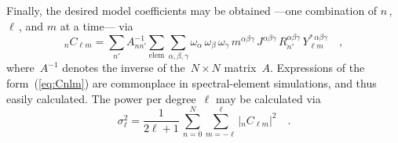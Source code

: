 \documentclass[extra,mreferee]{gji}
\begin{document}
Finally, the desired model coefficients may be obtained ---one combination of $n$\,, $\ell$\,, and $m$ at a time--- via
\begin{equation}
    {}_nC_{\ell m}=\sum_{n'}A^{-1}_{nn'}\sum_{\mathrm{elem}}\sum_{\alpha,\beta,\gamma}\omega_\alpha\,\omega_\beta\,\omega_\gamma\,m^{\alpha\beta\gamma}\,J^{\alpha\beta\gamma}\,R_{n'}^{\alpha\beta\gamma}\,Y_{\ell m}^{*\,\alpha\beta\gamma}
    \quad ,
    \label{eq:Cnlm}
\end{equation}
where~$A^{-1}$ denotes the inverse of the~$N\times N$ matrix~$A$.
Expressions of the form~(\ref{eq:Cnlm}) are commonplace in spectral-element simulations,
and thus easily calculated.
The power per degree~$\ell$ may be calculated via~\citep[][Eqn.~B.95]{DT98}
\begin{equation}
    \sigma_\ell^2=\frac{1}{2\ell+1}\,\sum_{n=0}^N\sum_{m=-\ell}^\ell|{}_nC_{\ell m}|^2
    \quad .
\end{equation}
\end{document}
